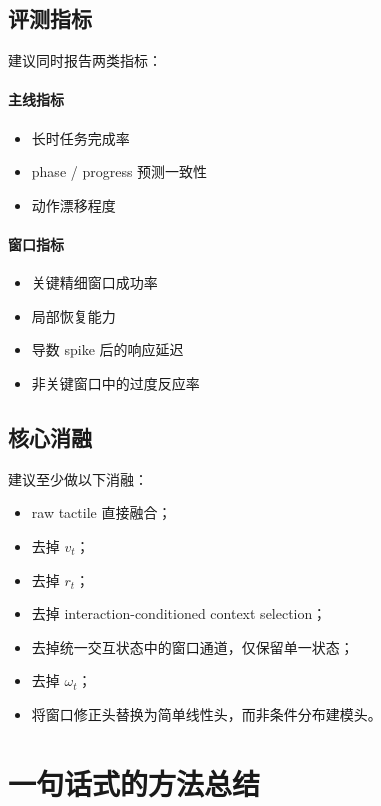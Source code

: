 \documentclass[11pt]{article}
\begin{document}
\subsection{评测指标}

建议同时报告两类指标：

\paragraph{主线指标}
\begin{itemize}[leftmargin=2em]
    \item 长时任务完成率
    \item phase / progress 预测一致性
    \item 动作漂移程度
\end{itemize}

\paragraph{窗口指标}
\begin{itemize}[leftmargin=2em]
    \item 关键精细窗口成功率
    \item 局部恢复能力
    \item 导数 spike 后的响应延迟
    \item 非关键窗口中的过度反应率
\end{itemize}

\subsection{核心消融}

建议至少做以下消融：
\begin{itemize}[leftmargin=2em]
    \item raw tactile 直接融合；
    \item 去掉 $v_t$；
    \item 去掉 $r_t$；
    \item 去掉 interaction-conditioned context selection；
    \item 去掉统一交互状态中的窗口通道，仅保留单一状态；
    \item 去掉 $\omega_t$；
    \item 将窗口修正头替换为简单线性头，而非条件分布建模头。
\end{itemize}

\section{一句话式的方法总结}
\end{document}
